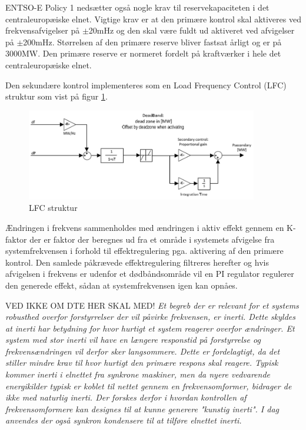 ENTSO-E Policy 1 nedsætter også nogle krav til reservekapaciteten i det centraleuropæiske elnet. Vigtige krav er at den primære kontrol skal aktiveres ved frekvensafvigelser på $\pm$20mHz og den skal være fuldt ud aktiveret ved afvigelser på $\pm$200mHz. Størrelsen af den primære reserve bliver fastsat årligt og er på 3000MW. Den primære reserve er normeret fordelt på kraftværker i hele det centraleuropæiske elnet.

Den sekundære kontrol implementeres som en Load Frequency Control (LFC) struktur som vist på figur \ref{fig:sekundaerkontrol}. 

\begin{figure}[H]
	\centering
	\includegraphics[width=0.9\textwidth]{figurer/Sekundaer_kontrol}
	\caption{LFC struktur}
	\label{fig:sekundaerkontrol}
\end{figure}

Ændringen i frekvens sammenholdes med ændringen i aktiv effekt gennem en K-faktor der er faktor der beregnes ud fra et område i systemets afvigelse fra systemfrekvensen i forhold til effektregulering pga. aktivering af den primære kontrol. Den samlede påkrævede effektregulering filtreres herefter og hvis afvigelsen i frekvens er udenfor et dødbåndsområde vil en PI regulator regulerer den generede effekt, sådan at systemfrekvensen igen kan opnåes.


VED IKKE OM DTE HER SKAL MED!
\textit{Et begreb der er relevant for et systems robusthed overfor forstyrrelser der vil påvirke frekvensen, er inerti. Dette skyldes at inerti har betydning for hvor hurtigt et system reagerer overfor ændringer. Et system med stor inerti vil have en længere responstid på forstyrrelse og frekvensændringen vil derfor sker langsommere. Dette er fordelagtigt, da det stiller mindre krav til hvor hurtigt den primære respons skal reagere. Typisk kommer inerti i elnettet fra synkrone maskiner, men da nyere vedvarende energikilder typisk er koblet til nettet gennem en frekvensomformer, bidrager de ikke med naturlig inerti. Der forskes derfor i hvordan kontrollen af frekvensomformere kan designes til at kunne generere "kunstig inerti". I dag anvendes der også synkron kondensere til at tilføre elnettet inerti.}


